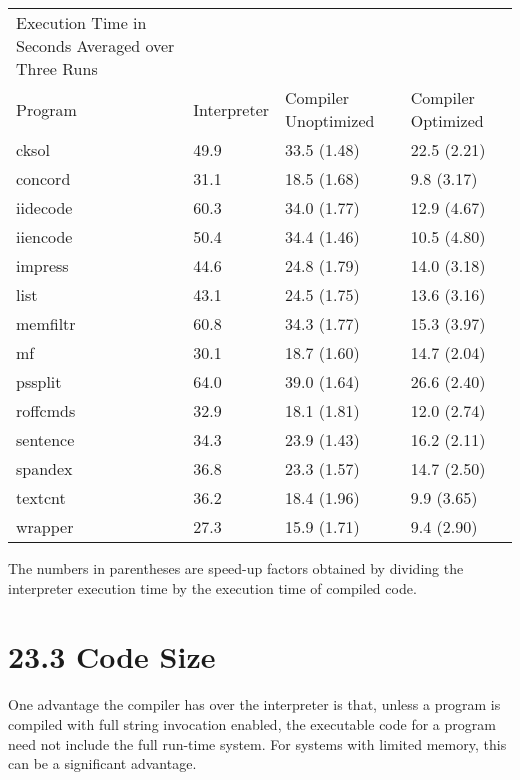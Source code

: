 \begin{center}
\tablefirsthead{}
\tablehead{}
\tabletail{}
\tablelasttail{}
\begin{xtabular}{m{3.3525598in}m{0.6143598in}m{0.7684598in}m{0.6434598in}}
 Execution Time in Seconds Averaged over Three Runs &
~
 &
~
 &
~
\\
 Program &
 Interpreter &
 Compiler \newline
Unoptimized &
 Compiler \newline
Optimized\\
 cksol  &
 49.9  &
 33.5 (1.48)  &
 22.5 (2.21) \\
 concord  &
 31.1  &
 18.5 (1.68)  &
 9.8 (3.17) \\
 iidecode  &
 60.3  &
 34.0 (1.77)  &
 12.9 (4.67) \\
 iiencode  &
 50.4  &
 34.4 (1.46)  &
 10.5 (4.80) \\
 impress  &
 44.6  &
 24.8 (1.79)  &
 14.0 (3.18) \\
 list  &
 43.1  &
 24.5 (1.75)  &
 13.6 (3.16) \\
 memfiltr  &
 60.8  &
 34.3 (1.77)  &
 15.3 (3.97) \\
 mf  &
 30.1  &
 18.7 (1.60)  &
 14.7 (2.04) \\
 pssplit  &
 64.0  &
 39.0 (1.64)  &
 26.6 (2.40) \\
 roffcmds  &
 32.9  &
 18.1 (1.81)  &
 12.0 (2.74) \\
 sentence  &
 34.3  &
 23.9 (1.43)  &
 16.2 (2.11) \\
 spandex  &
 36.8  &
 23.3 (1.57)  &
 14.7 (2.50) \\
 textcnt  &
 36.2  &
 18.4 (1.96)  &
 9.9 (3.65) \\
 wrapper  &
 27.3  &
 15.9 (1.71)  &
 9.4 (2.90) \\
\end{xtabular}
\end{center}

The numbers in parentheses are speed-up factors obtained by dividing
the interpreter execution time by the execution time of compiled code.


\section[23.3 Code Size]{23.3 Code Size}

One advantage the compiler has over the interpreter is that, unless a
program is compiled with full string invocation enabled, the
executable code for a program need not include the full run-time
system. For systems with limited memory, this can be a significant
advantage.

